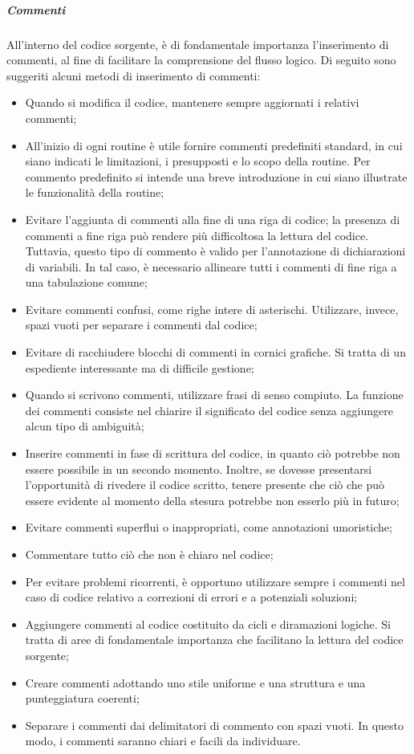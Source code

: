 \subparagraph{Commenti}
All'interno del codice sorgente, è di fondamentale importanza l'inserimento di commenti, al fine di facilitare la comprensione del flusso logico.
Di seguito sono suggeriti alcuni metodi di inserimento di commenti:
\begin{itemize}
\item
Quando si modifica il codice, mantenere sempre aggiornati i relativi commenti;
\item
All'inizio di ogni routine è utile fornire commenti predefiniti standard, in cui siano indicati le limitazioni, i presupposti e lo scopo della routine. Per commento predefinito si intende una breve introduzione in cui siano illustrate le funzionalità della routine;
\item
Evitare l'aggiunta di commenti alla fine di una riga di codice; la presenza di commenti a fine riga può rendere più difficoltosa la lettura del codice. Tuttavia, questo tipo di commento è valido per l'annotazione di dichiarazioni di variabili. In tal caso, è necessario allineare tutti i commenti di fine riga a una tabulazione comune;
\item
Evitare commenti confusi, come righe intere di asterischi. Utilizzare, invece, spazi vuoti per separare i commenti dal codice;
\item
Evitare di racchiudere blocchi di commenti in cornici grafiche. Si tratta di un espediente interessante ma di difficile gestione;
\item
Quando si scrivono commenti, utilizzare frasi di senso compiuto. La funzione dei commenti consiste nel chiarire il significato del codice senza aggiungere alcun tipo di ambiguità;
\item
Inserire commenti in fase di scrittura del codice, in quanto ciò potrebbe non essere possibile in un secondo momento. Inoltre, se dovesse presentarsi l'opportunità di rivedere il codice scritto, tenere presente che ciò che può essere evidente al momento della stesura potrebbe non esserlo più in futuro;
\item
Evitare commenti superflui o inappropriati, come annotazioni umoristiche;
\item
Commentare tutto ciò che non è chiaro nel codice;
\item
Per evitare problemi ricorrenti, è opportuno utilizzare sempre i commenti nel caso di codice relativo a correzioni di errori e a potenziali soluzioni;
\item
Aggiungere commenti al codice costituito da cicli e diramazioni logiche. Si tratta di aree di fondamentale importanza che facilitano la lettura del codice sorgente;
\item
Creare commenti adottando uno stile uniforme e una struttura e una punteggiatura coerenti;
\item
Separare i commenti dai delimitatori di commento con spazi vuoti. In questo modo, i commenti saranno chiari e facili da individuare.
\end{itemize}

